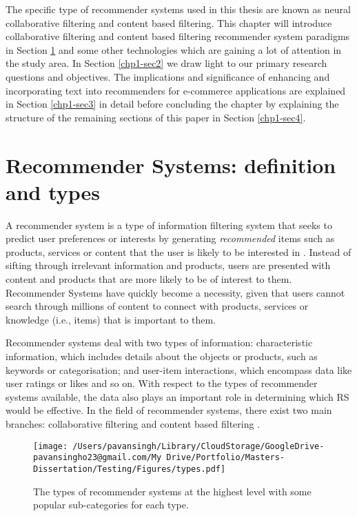 The specific type of recommender systems used in this thesis are known as neural collaborative filtering and content based filtering. This chapter will introduce collaborative filtering and content based filtering recommender system paradigms in Section \ref{chp1-sec1} and some other technologies which are gaining a lot of attention in the study area. In Section \ref{chp1-sec2} we draw light to our primary research questions and objectives. The implications and significance of enhancing and incorporating text into recommenders for e-commerce applications are explained in Section \ref{chp1-sec3} in detail before concluding the chapter by explaining the structure of the remaining sections of this paper in Section \ref{chp1-sec4}.



\section{Recommender Systems: definition and types}
\label{chp1-sec1}

A recommender system is a type of information filtering system that seeks to predict user preferences or interests by generating \textit{recommended} items such as products, services or content that the user is likely to be interested in \citep{seth2022comparative}. Instead of sifting through irrelevant information and products, users are presented with content and products that are more likely to be of interest to them. Recommender Systems have quickly become a necessity, given that users cannot search through millions of content to connect with products, services or knowledge (i.e., items) that is important to them. 

Recommender systems deal with two types of information: characteristic information, which includes details about the objects or products, such as keywords or categorisation; and user-item interactions, which encompass data like user ratings or likes and so on.  With respect to the types of recommender systems available, the data also plays an important role in determining which RS would be effective. In the field of recommender systems, there exist two main branches: collaborative filtering and content based filtering \citep{thorat2015survey}.

\begin{figure}[ht]
    \centering
    \texttt{[image: /Users/pavansingh/Library/CloudStorage/GoogleDrive-pavansingho23@gmail.com/My Drive/Portfolio/Masters-Dissertation/Testing/Figures/types.pdf]}
    \caption{The types of recommender systems at the highest level with some popular sub-categories for each type.}
    \label{fig:types_rs}
\end{figure}

